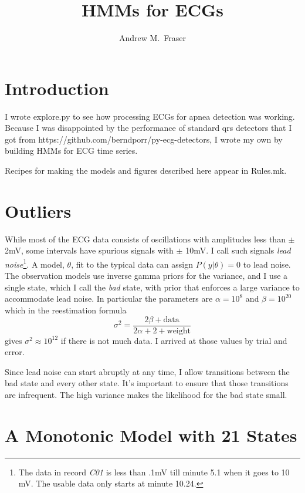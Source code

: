 \documentclass[12pt]{article}
\title{HMMs for ECGs}
\author{Andrew M.\ Fraser}
\begin{document}
\maketitle

\section{Introduction}
\label{sec:introduction}

I wrote explore.py to see how processing ECGs for apnea detection was
working.  Because I was disappointed by the performance of standard qrs
detectors that I got from
https://github.com/berndporr/py-ecg-detectors, I wrote my own by
building HMMs for ECG time series.

Recipes for making the models and figures described here appear in
Rules.mk.

\section{Outliers}
\label{sec:outliers}

While most of the ECG data consists of oscillations with amplitudes
less than $\pm$ 2mV, some intervals have spurious signals with $\pm$
10mV.  I call such signals \emph{lead noise}\footnote{The data in
  record \emph{C01} is less than .1mV till minute 5.1 when it goes to
  10 mV.  The usable data only starts at minute 10.24.}.  A model,
$\theta$, fit to the typical data can assign $P(y|\theta) = 0$ to lead
noise.  The observation models use inverse gamma priors for the
variance, and I use a single state, which I call the \emph{bad} state,
with prior that enforces a large variance to accommodate lead noise.
In particular the parameters are $\alpha=10^{8}$ and $\beta=10^{20}$
which in the reestimation formula
\begin{equation*}
  \sigma^2 = \frac{2 \beta + \text{data}}{2 \alpha +2 + \text{weight}}
\end{equation*}
gives $\sigma^2 \approx 10^{12}$ if there is not much data.  I arrived
at those values by trial and error.

Since lead noise can start abruptly at any time, I allow transitions
between the bad state and every other state.  It's important to ensure
that those transitions are infrequent.  The high variance makes the
likelihood for the bad state small.

\section{A Monotonic Model with 21 States}
\label{sec:mono20}
\end{document}
